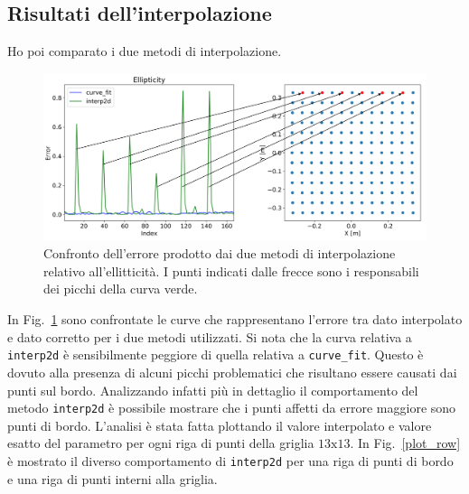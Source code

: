 \documentclass[12pt,a4paper,final]{book}
\begin{document}
\subsection{Risultati dell'interpolazione}\label{risultati_interpolazione}
Ho poi comparato i due metodi di interpolazione.
\begin{figure}[!ht]
	\centering
	\includegraphics[width=\linewidth]{../figures/punti_prob.png}
	\caption{Confronto dell'errore prodotto dai due metodi di interpolazione relativo all'ellitticità. I punti indicati dalle frecce sono i responsabili dei picchi della curva verde.}
	\label{err_int}
\end{figure}
\newline
In Fig.~\ref{err_int} sono confrontate le curve che rappresentano l'errore tra dato interpolato e dato corretto per i due metodi utilizzati. Si nota che la curva relativa a \texttt{interp2d} è sensibilmente peggiore di quella relativa a \texttt{curve\_fit}. Questo è dovuto alla presenza di alcuni picchi problematici che risultano essere causati dai punti sul bordo.
Analizzando infatti più in dettaglio il comportamento del metodo \texttt{interp2d} è possibile mostrare che i punti affetti da errore maggiore sono punti di bordo. L'analisi è stata fatta plottando il valore interpolato e valore esatto del parametro per ogni riga di punti della griglia $13\text{x}13$.
In Fig.~\ref{plot_row} è mostrato il diverso comportamento di \texttt{interp2d} per una riga di punti di bordo e una riga di punti interni alla griglia.
\end{document}
